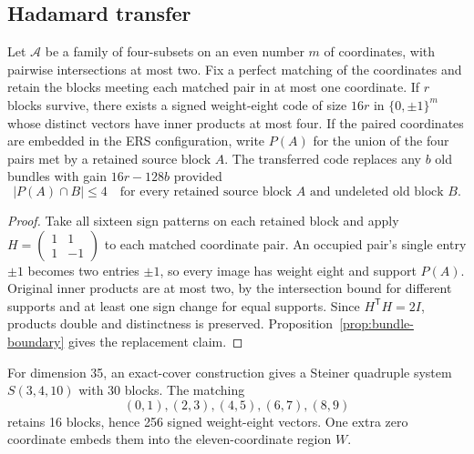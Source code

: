 \subsection{Hadamard transfer}
\begin{lemma}\label{lem:hadamard-transfer}
Let $\mathcal A$ be a family of four-subsets on an even number $m$ of
coordinates, with pairwise intersections at most two. Fix a perfect
matching of the coordinates and retain the blocks meeting each matched
pair in at most one coordinate. If $r$ blocks survive, there exists a
signed weight-eight code of size $16r$ in $\{0,\pm1\}^{m}$ whose distinct
vectors have inner products at most four.
If the paired coordinates are embedded in the ERS configuration, write
$P(A)$ for the union of the four pairs met by a retained source block $A$.
The transferred code replaces any $b$ old bundles with gain $16r-128b$
provided
\begin{equation}\label{eq:transfer-boundary}
 |P(A)\cap B|\le4
 \quad\text{for every retained source block $A$ and undeleted old block $B$}.
\end{equation}
\end{lemma}
\begin{proof}
Take all sixteen sign patterns on each retained block and apply
$H=\left(\begin{smallmatrix}1&1\\1&-1\end{smallmatrix}\right)$ to each
matched coordinate pair. An occupied pair's single entry $\pm1$ becomes
two entries $\pm1$, so every image has weight eight and support $P(A)$.
Original inner products are at most two, by the intersection bound
for different supports and at least one sign change for equal supports.
Since $H^{\mathsf T}H=2I$, products double and distinctness is preserved.
Proposition~\ref{prop:bundle-boundary} gives the replacement claim.
\end{proof}

For dimension 35, an exact-cover construction gives a Steiner quadruple
system $S(3,4,10)$ with 30 blocks. The matching
\[
(0,1),(2,3),(4,5),(6,7),(8,9)
\]
retains 16 blocks, hence 256 signed weight-eight vectors. One extra zero
coordinate embeds them into the eleven-coordinate region $W$.

